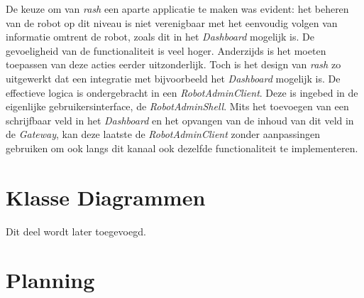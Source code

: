 \documentclass[12pt,a4paper]{report}
\begin{document}
De keuze om van \emph{rash} een aparte applicatie te maken was evident: het beheren van de robot op dit niveau is niet verenigbaar met het eenvoudig volgen van informatie omtrent de robot, zoals dit in het \emph{Dashboard} mogelijk is. De gevoeligheid van de functionaliteit is veel hoger. Anderzijds is het moeten toepassen van deze acties eerder uitzonderlijk. Toch is het design van \emph{rash} zo uitgewerkt dat een integratie met bijvoorbeeld het \emph{Dashboard} mogelijk is. De effectieve logica is ondergebracht in een \emph{RobotAdminClient}. Deze is ingebed in de eigenlijke gebruikersinterface, de \emph{RobotAdminShell}. Mits het toevoegen van een schrijfbaar veld in het \emph{Dashboard} en het opvangen van de inhoud van dit veld in de \emph{Gateway}, kan deze laatste de \emph{RobotAdminClient} zonder aanpassingen gebruiken om ook langs dit kanaal ook dezelfde functionaliteit te implementeren.

\chapter{Klasse Diagrammen}

Dit deel wordt later toegevoegd.

\chapter{Planning}

\label{appendix:planning}
\end{document}
